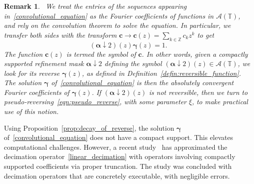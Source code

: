 \documentclass[12pt]{article}
\newtheorem{remark}{Remark}[section]
\begin{document}
\begin{remark}~\label{remark:gamma}
We treat the entries of the sequences appearing in~\eqref{convolutional_equation} as the Fourier coefficients of functions in $\mathcal{A}(\mathbb{T})$, and rely on the convolution theorem to solve the equation. In particular, we transfer both sides with the transform $\boldsymbol{c}\rightarrow\boldsymbol{c}(z)=\sum_{k\in\mathbb{Z}}c_kz^k$ to get
\begin{equation}~\label{Z_transform}
    (\boldsymbol{\alpha}\downarrow2)(z)\boldsymbol{\gamma}(z)=1.
\end{equation}
The function $\boldsymbol{c}(z)$ is termed the symbol of $\boldsymbol{c}$. In other words, given a compactly supported refinement mask $\boldsymbol{\alpha}\downarrow2$ defining the symbol $(\boldsymbol{\alpha}\downarrow 2)(z)\in\mathcal{A}(\mathbb{T})$, we look for its reverse $\boldsymbol{\gamma}(z)$, as defined in Definition~\ref{defin:reversible_function}. The solution $\boldsymbol{\gamma}$ of~\eqref{convolutional_equation} is then the absolutely convergent Fourier coefficients of $\boldsymbol{\gamma}(z)$. If $(\boldsymbol{\alpha}\downarrow2)(z)$ is not reversible, then we turn to pseudo-reversing~\eqref{eqn:pseudo_reverse}, with some parameter $\xi$, to make practical use of this notion.
\end{remark}

Using Proposition~\ref{prop:decay_of_reverse}, the solution $\boldsymbol{\gamma}$ of~\eqref{convolutional_equation} does not have a compact support. This elevates computational challenges. However, a recent study~\cite{mattar2023pyramid} has approximated the decimation operator~\eqref{linear_decimation} with operators involving compactly supported coefficients via proper truncation. The study was concluded with decimation operators that are concretely executable, with negligible errors.
\end{document}
